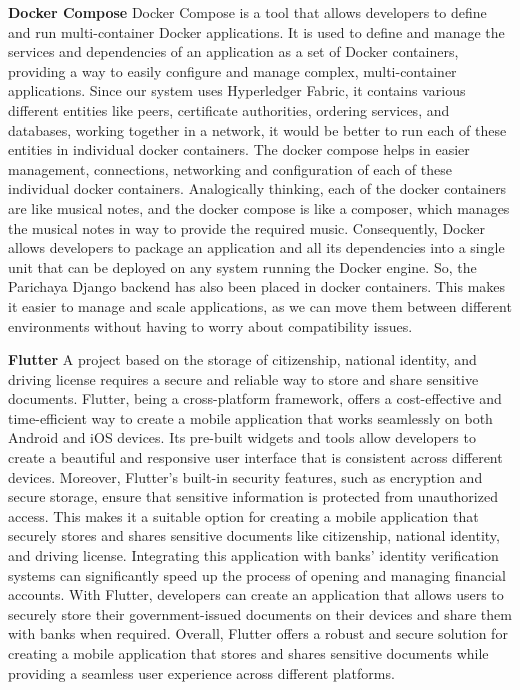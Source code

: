 \textbf{Docker Compose} \newline
Docker Compose is a tool that allows developers to define and run multi-container Docker applications. It is used to define and manage the services and dependencies of an application as a set of Docker containers, providing a way to easily configure and manage complex, multi-container applications. Since our system uses Hyperledger Fabric, it contains various different entities like peers, certificate authorities, ordering services, and databases, working together in a network, it would be better to run each of these entities in individual docker containers. The docker compose helps in easier management, connections, networking and configuration of each of these individual docker containers. Analogically thinking, each of the docker containers are like musical notes, and the docker compose is like a composer, which manages the musical notes in way to provide the required music. Consequently, Docker allows developers to package an application and all its dependencies into a single unit that can be deployed on any system running the Docker engine. So, the Parichaya Django backend has also been placed in docker containers. This makes it easier to manage and scale applications, as we can move them between different environments without having to worry about compatibility issues.\cite{bhat2022understanding}

\textbf{Flutter}\newline
A project based on the storage of citizenship, national identity, and driving license requires a secure and reliable way to store and share sensitive documents. Flutter, being a cross-platform framework, offers a cost-effective and time-efficient way to create a mobile application that works seamlessly on both Android and iOS devices. Its pre-built widgets and tools allow developers to create a beautiful and responsive user interface that is consistent across different devices\cite{tashildar2020application}. Moreover, Flutter's built-in security features, such as encryption and secure storage, ensure that sensitive information is protected from unauthorized access. This makes it a suitable option for creating a mobile application that securely stores and shares sensitive documents like citizenship, national identity, and driving license. Integrating this application with banks' identity verification systems can significantly speed up the process of opening and managing financial accounts. With Flutter, developers can create an application that allows users to securely store their government-issued documents on their devices and share them with banks when required. Overall, Flutter offers a robust and secure solution for creating a mobile application that stores and shares sensitive documents while providing a seamless user experience across different platforms.

